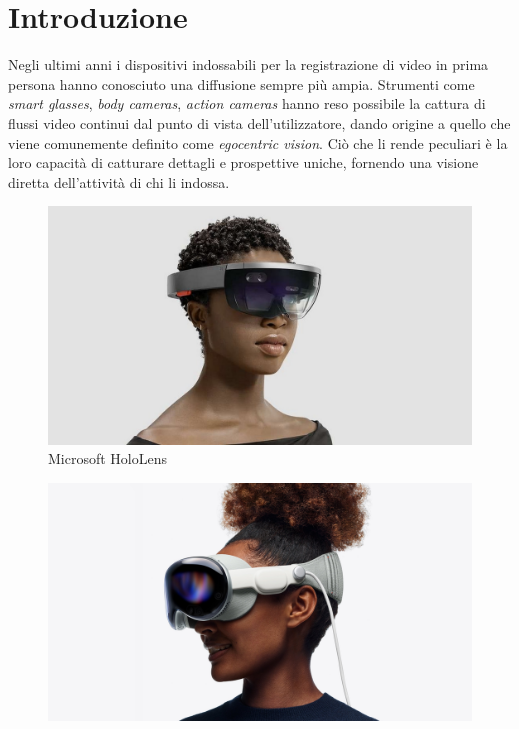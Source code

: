 \chapter{Introduzione}

Negli ultimi anni i dispositivi indossabili per la registrazione di video in prima persona hanno conosciuto una diffusione sempre più ampia. Strumenti come \emph{smart glasses}, \emph{body cameras}, \emph{action cameras} hanno reso possibile la cattura di flussi video continui dal punto di vista dell'utilizzatore, dando origine a quello che viene comunemente definito come \emph{egocentric vision}. Ciò che li rende peculiari è la loro capacità di catturare dettagli e prospettive uniche, fornendo una visione diretta dell'attività di chi li indossa.

\begin{figure}[ht]
    \centering
    \begin{minipage}{0.3\linewidth}
        \centering
        \includegraphics[width=\linewidth]{Images/hololens.png}\\
        Microsoft HoloLens \cite{MicrosoftHoloLens2025}
    \end{minipage}
    \hfill
    \begin{minipage}{0.3\linewidth}
        \centering
        \includegraphics[width=\linewidth]{Images/applepro.jpg}\\

\end{minipage}
\end{figure}
